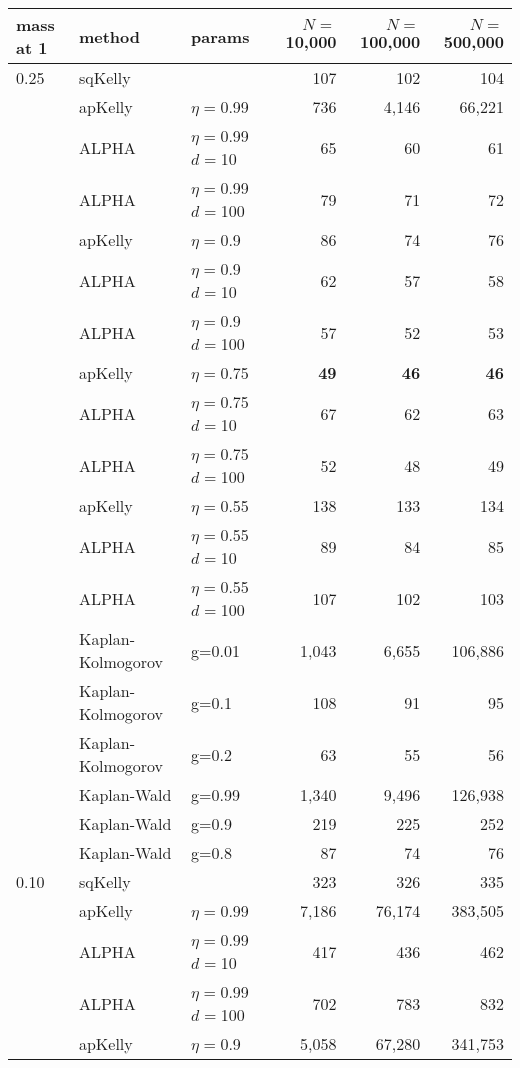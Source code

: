 \documentclass[12pt,runningheads]{llncs}
\begin{document}
{\begin{table}
\centering
\tiny
\begin{tabular}{lll|rrr} 
 mass at 1 & method & params & $N=$10,000 &  $N=$100,000 & $N=$500,000 \\
\hline 0.25 & sqKelly & & 107  & 102  & 104  \\
\cline{2-6} & apKelly & $\eta=$0.99 & 736  & 4,146  & 66,221  \\
\cline{2-6}
& ALPHA & $\eta=$0.99 $d=$10 & 65  & 60  & 61  \\
& ALPHA & $\eta=$0.99 $d=$100 & 79  & 71  & 72  \\
\cline{2-6} & apKelly & $\eta=$0.9 & 86  & 74  & 76  \\
\cline{2-6}
& ALPHA & $\eta=$0.9 $d=$10 & 62  & 57  & 58  \\
& ALPHA & $\eta=$0.9 $d=$100 & 57  & 52  & 53  \\
\cline{2-6} & apKelly & $\eta=$0.75 & \bf{49}  & \bf{46}  & \bf{46}  \\
\cline{2-6}
& ALPHA & $\eta=$0.75 $d=$10 & 67  & 62  & 63  \\
& ALPHA & $\eta=$0.75 $d=$100 & 52  & 48  & 49  \\
\cline{2-6} & apKelly & $\eta=$0.55 & 138  & 133  & 134  \\
\cline{2-6}
& ALPHA & $\eta=$0.55 $d=$10 & 89  & 84  & 85  \\
& ALPHA & $\eta=$0.55 $d=$100 & 107  & 102  & 103  \\
\cline{2-6}
 & Kaplan-Kolmogorov & g=0.01 & 1,043  & 6,655  & 106,886  \\
 & Kaplan-Kolmogorov & g=0.1 & 108  & 91  & 95  \\
 & Kaplan-Kolmogorov & g=0.2 & 63  & 55  & 56  \\
\cline{2-6}
 & Kaplan-Wald & g=0.99 & 1,340  & 9,496  & 126,938  \\
 & Kaplan-Wald & g=0.9 & 219  & 225  & 252  \\
 & Kaplan-Wald & g=0.8 & 87  & 74  & 76  \\
\hline 0.10 & sqKelly & & 323  & 326  & 335  \\
\cline{2-6} & apKelly & $\eta=$0.99 & 7,186  & 76,174  & 383,505  \\
\cline{2-6}
& ALPHA & $\eta=$0.99 $d=$10 & 417  & 436  & 462  \\
& ALPHA & $\eta=$0.99 $d=$100 & 702  & 783  & 832  \\
\cline{2-6} & apKelly & $\eta=$0.9 & 5,058  & 67,280  & 341,753  \\

\end{tabular}
\end{table}}
\end{document}

